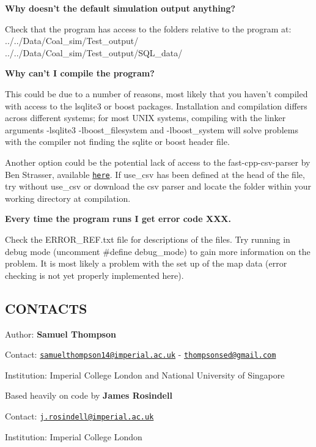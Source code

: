 \begin{DoxyItemize}
\item {\bfseries Why doesn’t the default simulation output anything?}
\begin{DoxyItemize}
\item Check that the program has access to the folders relative to the program at\+: ../../\+Data/\+Coal\+\_\+sim/\+Test\+\_\+output/ ../../\+Data/\+Coal\+\_\+sim/\+Test\+\_\+output/\+S\+Q\+L\+\_\+data/
\end{DoxyItemize}
\item {\bfseries Why can’t I compile the program?}
\begin{DoxyItemize}
\item This could be due to a number of reasons, most likely that you haven’t compiled with access to the lsqlite3 or boost packages. Installation and compilation differs across different systems; for most U\+N\+IX systems, compiling with the linker arguments -\/lsqlite3 -\/lboost\+\_\+filesystem and -\/lboost\+\_\+system will solve problems with the compiler not finding the sqlite or boost header file.
\item Another option could be the potential lack of access to the fast-\/cpp-\/csv-\/parser by Ben Strasser, available \href{https://github.com/ben-strasser/fast-cpp-csv-parser}{\tt here}. If use\+\_\+csv has been defined at the head of the file, try without use\+\_\+csv or download the csv parser and locate the folder within your working directory at compilation.
\end{DoxyItemize}
\item {\bfseries Every time the program runs I get error code X\+XX.}
\begin{DoxyItemize}
\item Check the E\+R\+R\+O\+R\+\_\+\+R\+E\+F.\+txt file for descriptions of the files. Try running in debug mode (uncomment {\ttfamily \#define debug\+\_\+mode}) to gain more information on the problem. It is most likely a problem with the set up of the map data (error checking is not yet properly implemented here).
\end{DoxyItemize}
\end{DoxyItemize}

\subsection*{C\+O\+N\+T\+A\+C\+TS}

Author\+: {\bfseries Samuel Thompson}

Contact\+: \href{mailto:samuelthompson14@imperial.ac.uk}{\tt samuelthompson14@imperial.\+ac.\+uk} -\/ \href{mailto:thompsonsed@gmail.com}{\tt thompsonsed@gmail.\+com}

Institution\+: Imperial College London and National University of Singapore

Based heavily on code by {\bfseries James Rosindell}

Contact\+: \href{mailto:j.rosindell@imperial.ac.uk}{\tt j.\+rosindell@imperial.\+ac.\+uk}

Institution\+: Imperial College London 